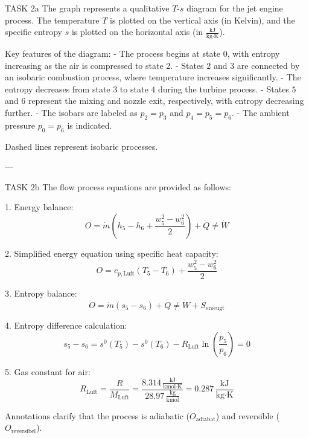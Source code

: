 TASK 2a  
The graph represents a qualitative \( T \)-\( s \) diagram for the jet engine process. The temperature \( T \) is plotted on the vertical axis (in Kelvin), and the specific entropy \( s \) is plotted on the horizontal axis (in \( \frac{\text{kJ}}{\text{kg·K}} \)).  

Key features of the diagram:  
- The process begins at state \( 0 \), with entropy increasing as the air is compressed to state \( 2 \).  
- States \( 2 \) and \( 3 \) are connected by an isobaric combustion process, where temperature increases significantly.  
- The entropy decreases from state \( 3 \) to state \( 4 \) during the turbine process.  
- States \( 5 \) and \( 6 \) represent the mixing and nozzle exit, respectively, with entropy decreasing further.  
- The isobars are labeled as \( p_2 = p_3 \) and \( p_4 = p_5 = p_6 \).  
- The ambient pressure \( p_0 = p_6 \) is indicated.  

Dashed lines represent isobaric processes.  

---

TASK 2b  
The flow process equations are provided as follows:  

1. Energy balance:  
\[
O = \dot{m} \left( h_5 - h_6 + \frac{w_5^2 - w_6^2}{2} \right) + \dot{Q} \neq \dot{W}
\]  

2. Simplified energy equation using specific heat capacity:  
\[
O = c_{p,\text{Luft}} \left( T_5 - T_6 \right) + \frac{w_5^2 - w_6^2}{2}
\]  

3. Entropy balance:  
\[
O = \dot{m} \left( s_5 - s_6 \right) + \dot{Q} \neq \dot{W} + \dot{S}_{\text{erzeugt}}
\]  

4. Entropy difference calculation:  
\[
s_5 - s_6 = s^0(T_5) - s^0(T_6) - R_{\text{Luft}} \ln \left( \frac{p_5}{p_6} \right) = 0
\]  

5. Gas constant for air:  
\[
R_{\text{Luft}} = \frac{R}{M_{\text{Luft}}} = \frac{8.314 \, \frac{\text{kJ}}{\text{kmol·K}}}{28.97 \, \frac{\text{kg}}{\text{kmol}}} = 0.287 \, \frac{\text{kJ}}{\text{kg·K}}
\]  

Annotations clarify that the process is adiabatic (\( O_{\text{adiabat}} \)) and reversible (\( O_{\text{reversibel}} \)).
